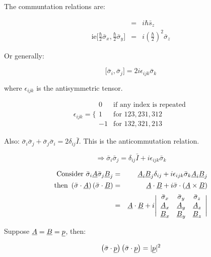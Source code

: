 The communtation relations are: \nopagebreak

\begin{eqnarray*}
  [\bar{s}_x,\bar{s}_y] & = & i\hbar \bar{s}_z \\
  \textrm{ie} \Bigg[ \frac{\hbar}{2}\bar{\sigma}_x,\frac{\hbar}{2}\bar{\sigma}_y \Bigg] & = & i\left(\frac{\hbar}{2}\right)^2\bar{\sigma}_z
\end{eqnarray*}

Or generally:

\[
  \Big[\bar{\sigma}_i,\bar{\sigma}_j\Big] = 2i\epsilon_{ijk}\bar{\sigma}_k
\]

where $\epsilon_{ijk}$ is the antisymmetric tensor.

\[
  \epsilon_{ijk} = 
  \Bigg\{
    \begin{array}{cc}
    0  & \textrm{if any index is repeated} \\
    1  & \textrm{for } 123, 231, 312 \\
    -1 & \textrm{for } 132, 321, 213
    \end{array}
\]

Also: $\bar{\sigma}_i\bar{\sigma}_j + \bar{\sigma}_j\bar{\sigma}_i = 2\delta_{ij}\bar{I}$.  This is the anticommutation relation.

\[
  \Rightarrow \bar{\sigma}_i\bar{\sigma}_j = \delta_{ij} \bar{I} + i\epsilon_{ijk}\bar{\sigma}_k
\]

\begin{eqnarray*}
  \textrm{Consider }\bar{\sigma}_i\underline{A}\bar{\sigma}_j\underline{B}_j & = & \underline{A}_i\underline{B}_j\delta_{ij} + i\epsilon_{ijk}\bar{\sigma}_k\underline{A}_i\underline{B}_j \\
  \textrm{then } \left(\bar{\sigma}\cdot\underline{A}\right)\left(\bar{\sigma}\cdot\underline{B}\right) & = & \underline{A}\cdot\underline{B} + i\bar{\sigma}\cdot\left(\underline{A}\times\underline{B}\right) \\
  & = & \underline{A}\cdot\underline{B} + i
  \Bigg|
    \begin{array}{ccc}
    \bar{\sigma}_x  & \bar{\sigma}_y  & \bar{\sigma}_z  \\
    \underline{A}_x & \underline{A}_y & \underline{A}_z \\
    \underline{B}_x & \underline{B}_y & \underline{B}_z
    \end{array}
  \Bigg|
\end{eqnarray*}

Suppose $\underline{A} = \underline{B} = \underline{p}$, then:

\[
  \left(\bar{\sigma}\cdot\underline{p}\right)\left(\bar{\sigma}\cdot\underline{p}\right) = |\underline{p}|^2
\]

